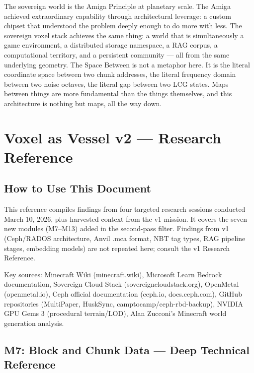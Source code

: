 \documentclass[11pt,letterpaper]{article}
\newcommand{\stageheader}[2]{%
  \noindent\colorbox{#2}{\makebox[\textwidth][l]{%
    \textcolor{white}{\bfseries\sffamily\hspace{6pt}#1\hspace{6pt}}}}%
  \vspace{0.5em}\par%
}
\begin{document}
The sovereign world is the Amiga Principle at planetary scale. The Amiga achieved extraordinary capability through architectural leverage: a custom chipset that understood the problem deeply enough to do more with less. The sovereign voxel stack achieves the same thing: a world that is simultaneously a game environment, a distributed storage namespace, a RAG corpus, a computational territory, and a persistent community --- all from the same underlying geometry. The Space Between is not a metaphor here. It is the literal coordinate space between two chunk addresses, the literal frequency domain between two noise octaves, the literal gap between two LCG states. Maps between things are more fundamental than the things themselves, and this architecture is nothing but maps, all the way down.

\newpage

\stageheader{STAGE 2 --- RESEARCH REFERENCE}{secondary}

\section{Voxel as Vessel v2 --- Research Reference}

\subsection{How to Use This Document}

This reference compiles findings from four targeted research sessions conducted March 10, 2026, plus harvested context from the v1 mission. It covers the seven new modules (M7--M13) added in the second-pass filter. Findings from v1 (Ceph/RADOS architecture, Anvil .mca format, NBT tag types, RAG pipeline stages, embedding models) are not repeated here; consult the v1 Research Reference.

Key sources: Minecraft Wiki (minecraft.wiki), Microsoft Learn Bedrock documentation, Sovereign Cloud Stack (sovereigncloudstack.org), OpenMetal (openmetal.io), Ceph official documentation (ceph.io, docs.ceph.com), GitHub repositories (MultiPaper, HuskSync, camptocamp/ceph-rbd-backup), NVIDIA GPU Gems 3 (procedural terrain/LOD), Alan Zucconi's Minecraft world generation analysis.

\subsection{M7: Block and Chunk Data --- Deep Technical Reference}
\end{document}
